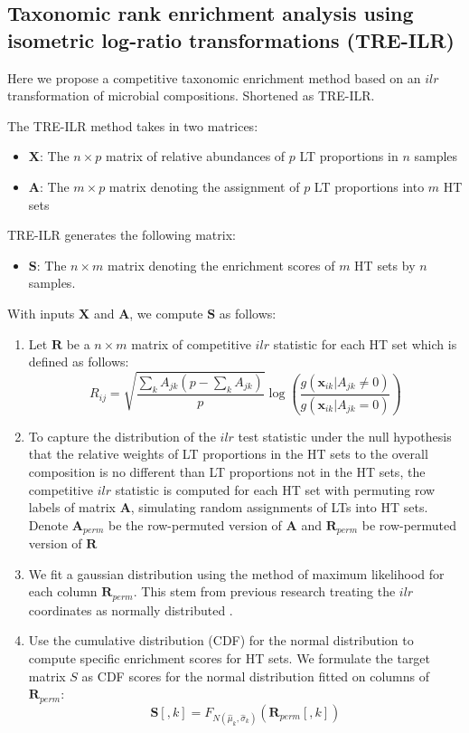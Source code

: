\documentclass{article}
\begin{document}
\subsection{Taxonomic rank enrichment analysis using isometric log-ratio transformations (TRE-ILR)}
Here we propose a competitive taxonomic enrichment method based on an $ilr$ transformation of microbial compositions. Shortened as TRE-ILR.  
\vspace{3mm}

\noindent The TRE-ILR method takes in two matrices: 
\begin{itemize}
    \item $\bm X$: The $n \times p$ matrix of relative abundances of $p$ LT proportions in $n$ samples
    \item $\bm A$: The $m \times p$ matrix denoting the assignment of $p$ LT proportions into $m$ HT sets
\end{itemize}
TRE-ILR generates the following matrix: 
\begin{itemize}
    \item $\bm S$: The $n \times m$ matrix denoting the enrichment scores of $m$ HT sets by $n$ samples. 
\end{itemize}
With inputs $\bm{X}$ and $\bm{A}$, we compute $\bm{S}$ as follows:  
\begin{enumerate}
    \item Let $\bm{R}$ be a $n \times m$ matrix of competitive $ilr$ statistic for each HT set which is defined as follows:
    \begin{equation}
    R_{ij} = \sqrt{\frac{\sum_k A_{jk}(p - \sum_k A_{jk})}{p}} \log \left(\frac{g(\bm{x}_{ik} |A_{jk} \neq 0)}{g(\bm{x}_{ik} | A_{jk} = 0)}\right)
    \end{equation}
    \item To capture the distribution of the $ilr$ test statistic under the null hypothesis that the relative weights of LT proportions in the HT sets to the overall composition is no different than LT proportions not in the HT sets, the competitive $ilr$ statistic is computed for each HT set with permuting row labels of matrix $\bm{A}$, simulating random assignments of LTs into HT sets. Denote $\bm{A}_{perm}$ be the row-permuted version of $\bm{A}$ and $\bm{R}_{perm}$ be row-permuted version of $\bm{R}$
    \item We fit a gaussian distribution using the method of maximum likelihood for each column $\bm{R}_{perm}$. This stem from previous research treating the $ilr$ coordinates as normally distributed \cite{egozcue2005}.  
    \item Use the cumulative distribution (CDF) for the normal distribution to compute specific enrichment scores for HT sets. We formulate the target matrix $S$ as CDF scores for the normal distribution fitted on columns of $\bm{R}_{perm}$:
    \begin{equation}
        \bm{S}[,k] = F_{N(\hat{\mu}_{k},\hat{\sigma}_{k})}(\bm{R}_{perm}[,k])
    \end{equation}
\end{enumerate}
\end{document}
